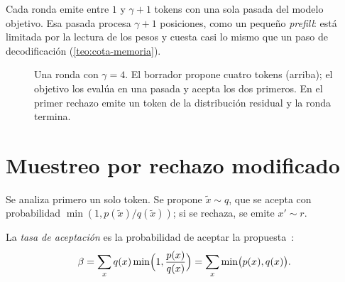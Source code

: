 Cada ronda emite entre $1$ y $\gamma+1$ tokens con una sola pasada del modelo objetivo. Esa pasada procesa $\gamma+1$ posiciones, como un pequeño \emph{prefill}: está limitada por la lectura de los pesos y cuesta casi lo mismo que un paso de decodificación (\cref{teo:cota-memoria}).

\begin{figure}[h]
\centering
{}
\caption{Una ronda con $\gamma=4$. El borrador propone cuatro tokens (arriba); el objetivo los evalúa en una pasada y acepta los dos primeros. En el primer rechazo emite un token de la distribución residual y la ronda termina.}
\label{fig:ronda}
\end{figure}

\section{Muestreo por rechazo modificado}

Se analiza primero un solo token. Se propone $\tilde x\sim q$, que se acepta con probabilidad $\min(1,p(\tilde x)/q(\tilde x))$; si se rechaza, se emite $x'\sim r$.

\begin{definicion}\label{def:beta}
La \emph{tasa de aceptación} es la probabilidad de aceptar la propuesta~\cite[definición~3.1]{leviathan}:
\[
\beta=\sum_{x}q(x)\min\Bigl(1,\frac{p(x)}{q(x)}\Bigr)=\sum_{x}\min\bigl(p(x),q(x)\bigr).
\]
\end{definicion}

